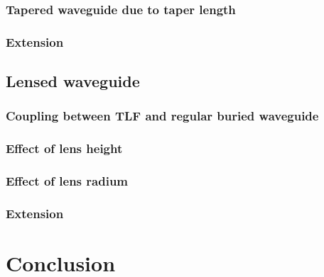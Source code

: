 \subsection{Tapered waveguide due to taper length}


\subsection{Extension}
\label{sect:optim_tapered_ext}


\section{Lensed waveguide}


\subsection{Coupling between TLF and regular buried waveguide}
\label{sect:optim_lensed_regular}


\subsection{Effect of lens height}

%
\subsection{Effect of lens radium}


\subsection{Extension}
\label{sect:optim_lensed_ext}

%
\chapter{Conclusion}

%



